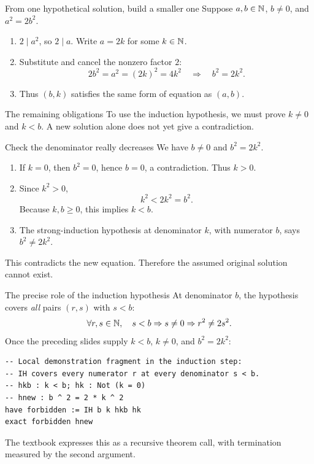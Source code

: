 \begin{frame}{From one hypothetical solution, build a smaller one}
Suppose $a,b\in\mathbb{N}$, $b\ne0$, and $a^2=2b^2$.
\begin{enumerate}
\item $2\mid a^2$, so $2\mid a$. Write $a=2k$ for some $k\in\mathbb{N}$.
\item Substitute and cancel the nonzero factor $2$:
\[
2b^2=a^2=(2k)^2=4k^2
\quad\Longrightarrow\quad b^2=2k^2.
\]
\item Thus $(b,k)$ satisfies the same form of equation as $(a,b)$.
\end{enumerate}
\begin{block}{The remaining obligations}
To use the induction hypothesis, we must prove $k\ne0$ and $k<b$. A new solution alone does not yet give a contradiction.
\end{block}
\end{frame}

\begin{frame}{Check the denominator really decreases}
We have $b\ne0$ and $b^2=2k^2$.
\begin{enumerate}
\item If $k=0$, then $b^2=0$, hence $b=0$, a contradiction. Thus $k>0$.
\item Since $k^2>0$,
\[
k^2<2k^2=b^2.
\]
Because $k,b\ge0$, this implies $k<b$.
\item The strong-induction hypothesis at denominator $k$, with numerator $b$, says $b^2\ne2k^2$.
\end{enumerate}
This contradicts the new equation. Therefore the assumed original solution cannot exist.
\end{frame}

\begin{frame}[fragile]{The precise role of the induction hypothesis}
At denominator $b$, the hypothesis covers \emph{all} pairs $(r,s)$ with $s<b$:
\[
\forall r,s\in\mathbb{N},\quad s<b\Rightarrow s\ne0\Rightarrow r^2\ne2s^2.
\]
Once the preceding slides supply $k<b$, $k\ne0$, and $b^2=2k^2$:
\begin{lstlisting}
-- Local demonstration fragment in the induction step:
-- IH covers every numerator r at every denominator s < b.
-- hkb : k < b; hk : Not (k = 0)
-- hnew : b ^ 2 = 2 * k ^ 2
have forbidden := IH b k hkb hk
exact forbidden hnew
\end{lstlisting}
The textbook expresses this as a recursive theorem call, with termination measured by the second argument.
\end{frame}

